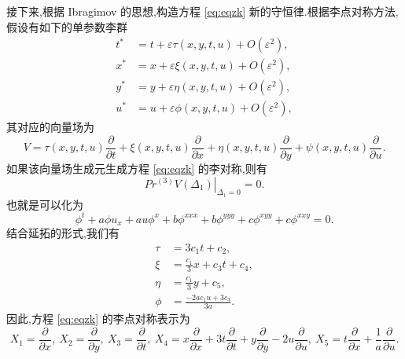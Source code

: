接下来,根据 Ibragimov \cite{wazwaz2012soli,yan2009per} 的思想,构造方程 \eqref{eq:eqzk} 新的守恒律.根据李点对称方法,假设有如下的单参数李群
\begin{equation*}
	\begin{aligned}
		t^*&=t+\varepsilon \tau(x,y,t,u)+O(\varepsilon^2),\\
		x^*&=x+\varepsilon \xi(x,y,t,u)+O(\varepsilon^2),\\
		y^*&=y+\varepsilon \eta(x,y,t,u)+O(\varepsilon^2),\\
		u^*&=u+\varepsilon \phi(x,y,t,u)+O(\varepsilon^2),
	\end{aligned}
\end{equation*}
其对应的向量场为
\begin{equation*}
	V=\tau(x,y,t,u)\frac{\partial}{\partial t}+\xi(x,y,t,u)\frac{\partial}{\partial x}+\eta(x,y,t,u)\frac{\partial}{\partial y}+\psi(x,y,t,u)\frac{\partial}{\partial u}.
\end{equation*}
如果该向量场生成元生成方程 \eqref{eq:eqzk} 的李对称,则有
\begin{equation*}
	\left. Pr^{(3)}V(\Delta_1)\right|_{\Delta_1=0}=0.
\end{equation*}
也就是可以化为
\begin{equation*}
	\phi^t+a\phi u_x + au\phi^x + b\phi^{xxx} + b\phi^{yyy}+c\phi^{xyy}+c\phi^{xxy}=0.
\end{equation*}
结合延拓的形式,我们有
\begin{equation*}
	\begin{aligned}
		\tau&=3c_1t+c_2,\\
		\xi&=\frac{c_1}{3}x+c_3t+c_4,\\
		\eta&=\frac{c_1}{3}y+c_5,\\
		\phi&=\frac{-2ac_1u+3c_3}{3a}.
	\end{aligned}
\end{equation*}
因此,方程 \eqref{eq:eqzk} 的李点对称表示为 \cite{wang2014soli}
\begin{equation*}
	X_{1}=\frac{\partial}{\partial x},~X_{2}=\frac{\partial}{\partial y},~X_{3}=\frac{\partial}{\partial t},~X_{4}=x\frac{\partial}{\partial x}+3t\frac{\partial}{\partial t}+y\frac{\partial}{\partial y}-2u\frac{\partial}{\partial u}, ~X_{5}=t\frac{\partial}{\partial x}+\frac{1}{a}\frac{\partial}{\partial u}.
\end{equation*}

